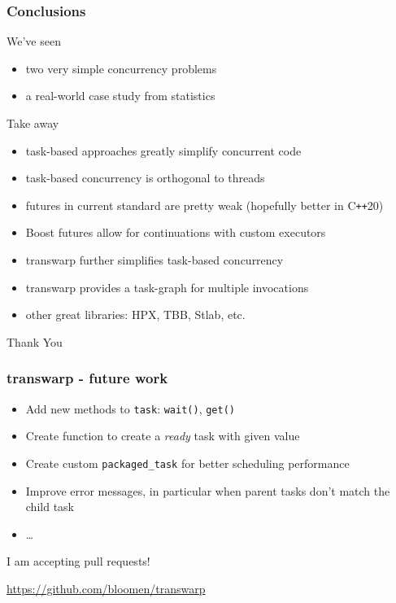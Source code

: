 \documentclass[12pt,aspectratio=169]{beamer}
\begin{document}
\begin{frame}[fragile]
\frametitle{Conclusions}
We've seen
\begin{itemize}
\item two very simple concurrency problems
\item a real-world case study from statistics
\end{itemize}
\bigskip

Take away
\begin{itemize}
\item task-based approaches greatly simplify concurrent code
\item task-based concurrency is orthogonal to threads
\item futures in current standard are pretty weak (hopefully better in C\texttt{++}20)
\item Boost futures allow for continuations with custom executors
\item transwarp further simplifies task-based concurrency 
\item transwarp provides a task-graph for multiple invocations
\item other great libraries: HPX, TBB, Stlab, etc.
\end{itemize}
\end{frame}

\begin{frame}[fragile]
\huge
\begin{center}
Thank You
\end{center}
\end{frame}

\begin{frame}[fragile]
\frametitle{transwarp - future work}
\begin{itemize}
\item Add new methods to \lstinline{task}: \lstinline{wait()}, \lstinline{get()}
\item Create function to create a \textit{ready} task with given value
\item Create custom \lstinline{packaged_task} for better scheduling performance
\item Improve error messages, in particular when parent tasks don't match the child task
\item \ldots
\end{itemize}
\bigskip
\bigskip
I am accepting pull requests!
\bigskip

\url{https://github.com/bloomen/transwarp}
\bigskip

\end{frame}
\end{document}
